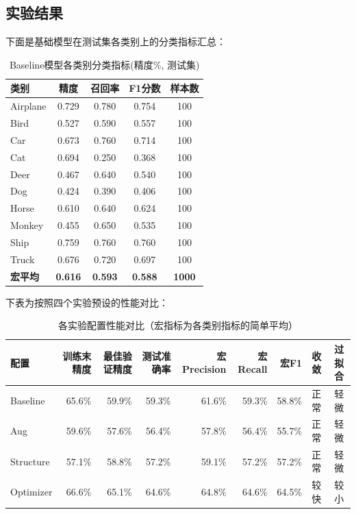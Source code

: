 \documentclass[12pt,a4paper]{ctexart}
\begin{document}
\subsection{实验结果}
下面是基础模型在测试集各类别上的分类指标汇总：

\begin{table}[H]
    \centering
    \begin{tabular}{lcccc}
        \toprule
        \textbf{类别} & \textbf{精度} & \textbf{召回率} & \textbf{F1分数} & \textbf{样本数} \\
        \midrule
        Airplane & 0.729 & 0.780 & 0.754 & 100 \\
        Bird & 0.527 & 0.590 & 0.557 & 100 \\
        Car & 0.673 & 0.760 & 0.714 & 100 \\
        Cat & 0.694 & 0.250 & 0.368 & 100 \\
        Deer & 0.467 & 0.640 & 0.540 & 100 \\
        Dog & 0.424 & 0.390 & 0.406 & 100 \\
        Horse & 0.610 & 0.640 & 0.624 & 100 \\
        Monkey & 0.455 & 0.650 & 0.535 & 100 \\
        Ship & 0.759 & 0.760 & 0.760 & 100 \\
        Truck & 0.676 & 0.720 & 0.697 & 100 \\
        \midrule
        \textbf{宏平均} & \textbf{0.616} & \textbf{0.593} & \textbf{0.588} & \textbf{1000} \\
        \bottomrule
    \end{tabular}
    \caption{Baseline模型各类别分类指标(精度\%, 测试集)}
\end{table}

下表为按照四个实验预设的性能对比：

\begin{table}[H]
    \centering
    \small
    \begin{tabular}{lrrrrrrlc}
        \toprule
        \textbf{配置} & \textbf{训练末精度} & \textbf{最佳验证精度} & \textbf{测试准确率} & \textbf{宏Precision} & \textbf{宏Recall} & \textbf{宏F1} & \textbf{收敛} & \textbf{过拟合} \\
        \midrule
        Baseline & 65.6\% & 59.9\% & 59.3\% & 61.6\% & 59.3\% & 58.8\% & 正常 & 轻微 \\
        Aug & 59.6\% & 57.6\% & 56.4\% & 57.8\% & 56.4\% & 55.7\% & 正常 & 轻微 \\
        Structure & 57.1\% & 58.8\% & 57.2\% & 59.1\% & 57.2\% & 57.2\% & 正常 & 轻微 \\
        Optimizer & 66.6\% & 65.1\% & 64.6\% & 64.8\% & 64.6\% & 64.5\% & 较快 & 较小 \\
        \bottomrule
    \end{tabular}
    \caption{各实验配置性能对比（宏指标为各类别指标的简单平均）}
\end{table}
\end{document}
